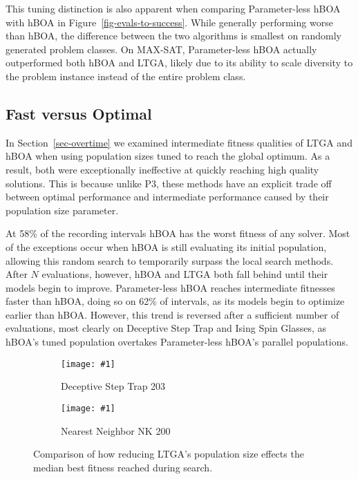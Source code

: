 \documentclass[twoside]{article}
\newcommand{\includegraphicsfit}[1]
{\texttt{[image: \#1]}}
\begin{document}
This tuning distinction is also apparent when comparing Parameter-less hBOA with hBOA in Figure~\ref{fig-evals-to-success}.
While generally performing worse than hBOA, the difference between the two algorithms is smallest
on randomly generated problem classes. On MAX-SAT, Parameter-less hBOA actually outperformed both hBOA and LTGA,
likely due to its ability to scale diversity to the problem instance instead of the entire problem class.

\subsection{Fast versus Optimal}
\label{sec-fast-vs-optimal}

In Section~\ref{sec-overtime} we examined intermediate fitness qualities of LTGA and hBOA when using
population sizes tuned to reach the global optimum. As a result, both were exceptionally ineffective
at quickly reaching high quality solutions. This is because unlike P3, these methods have an explicit
trade off between optimal performance and intermediate performance caused by their population size parameter.

At 58\% of the recording intervals hBOA has the worst fitness of any solver. Most of the exceptions
occur when hBOA is still evaluating its initial population, allowing this random search to temporarily surpass the
local search methods. After $N$ evaluations, however, hBOA and LTGA both fall behind until their models begin
to improve.
Parameter-less hBOA reaches intermediate fitnesses faster than hBOA, doing so on 62\% of intervals, as its models begin
to optimize earlier than hBOA.  However, this trend is reversed after a sufficient number of evaluations, most clearly
on Deceptive Step Trap and Ising Spin Glasses, as hBOA's tuned population overtakes Parameter-less hBOA's parallel populations.


\begin{figure}[t]
  \begin{centering}
    \begin{subfigure}{.5\textwidth}
      \begin{centering}
        \includegraphicsfit{small-pop-dst}
      \end{centering}
      \caption{Deceptive Step Trap 203}
      \label{fig-small-pop-dst}
    \end{subfigure}%
    \begin{subfigure}{.5\textwidth}
      \begin{centering}
        \includegraphicsfit{small-pop-nk}
      \end{centering}
      \caption{Nearest Neighbor NK 200}
      \label{fig-small-pop-nk}
    \end{subfigure}
  \end{centering}
  \caption{Comparison of how reducing LTGA's population size effects
           the median best fitness reached during search.}
  \label{fig-small-pop}
\end{figure}
\end{document}
